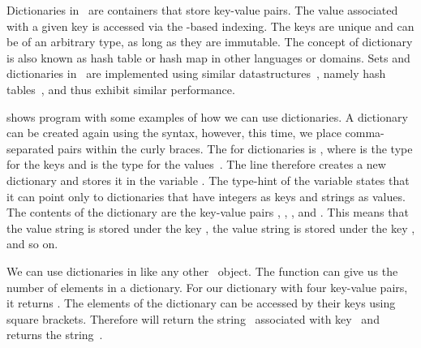 %
\label{sec:dictionaries}%
%
%
%
%
Dictionaries in \python\ are containers that store key-value pairs.
The value associated with a given key is accessed via the \pythonil{[...]}\pythonIdx{[\idxdots]}-based indexing.
The keys are unique and can be of an arbitrary type, as long as they are immutable.
The concept of dictionary is also known as hash table or hash map in other languages or domains.
Sets and dictionaries in \python\ are implemented using similar datastructures~\cite{PSF:TPW:TC}, namely hash tables~\cite{K1998SAS,CLRS2009ITA,SKS2019DSC}, and thus exhibit similar performance.%
%
\begin{sloppypar}%
 shows program  with some examples of how we can use dictionaries.
A dictionary can be created again using the  syntax, however, this time, we place comma-separated  pairs within the curly braces.
The  for dictionaries is , where  is the type for the keys and  is the type for the values~\cite{PEP585}.
The line  therefore creates a new dictionary and stores it in the variable .
The type-hint of the variable states that it can point only to dictionaries that have integers as keys and strings as values.
The contents of the dictionary are the key-value pairs , , , and .
This means that the value string  is stored under the key , the value string  is stored under the key , and so on.%
\end{sloppypar}%
%
We can use dictionaries in  like any other \python\ object.
The function  can give us the number of elements in a dictionary.
For our dictionary  with four key-value pairs, it returns .
The elements of the dictionary can be accessed by their keys using square brackets.
Therefore  will return the string~ associated with key~ and  returns the string~.%
%
